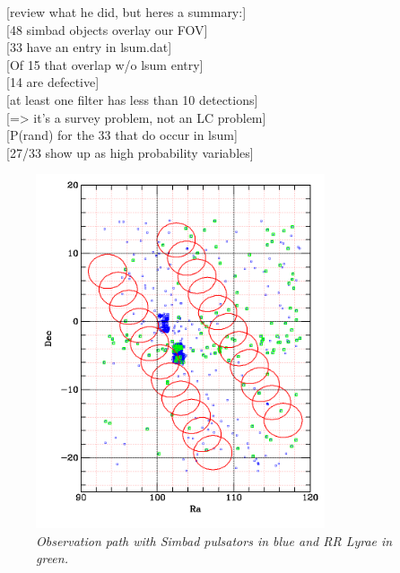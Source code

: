 \documentclass[aps,prb,twocolumn,superscriptaddress]{revtex4-1}
\begin{document}
~[review what he did, but heres a summary:]\\
~[48 simbad objects overlay our FOV]\\
~[33 have an entry in lsum.dat]\\
~[Of 15 that overlap w/o lsum entry]\\
~[14 are defective]\\
~[at least one filter has less than 10 detections]\\
~[=> it's a survey problem, not an LC problem]\\
~[P(rand) for the 33 that do occur in lsum]\\
~[27/33 show up as high probability variables]\\



\begin{figure}[H]
 \centering
 	\includegraphics[width=3.35in]{figures/simbadoverlap.png}
 \caption{\it \small{Observation path with Simbad pulsators in blue and RR Lyrae in green.}}
 \label{fig:simoverlap}
\end{figure}



\end{document}
